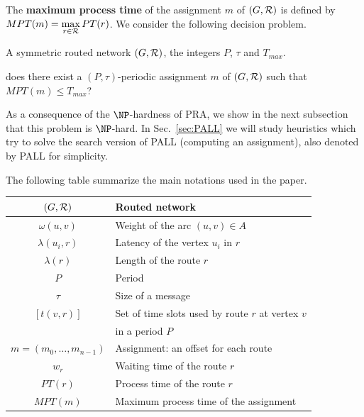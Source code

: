 \documentclass[10pt, conference, letterpaper]{IEEEtran}
\begin{document}
      
    The {\bf maximum process time} of the assignment $m$ of $(G,{\cal R})$ is defined by $MPT(m)=\max\limits_{r \in {\cal R}} PT(r)$. We consider the following decision problem.


        A symmetric routed network $(G,{\cal R})$, the integers $P$, $\tau$ and $T_{max}$.

       does there exist a $(P,\tau)$-periodic assignment $m$ of $(G,{\cal R})$ such that $MPT(m) \leq T_{max}$?

      As a consequence of the $\NP$-hardness of PRA, we show in the next subsection that this problem is $\NP$-hard. 
      In Sec.~\ref{sec:PALL} we will study heuristics which try to solve the search version of PALL (computing an assignment), also denoted by PALL for simplicity.

     
      The following table summarize the main notations used in the paper.
      \begin{center}
   \begin{tabularx}{0.5\textwidth}{|c|X|}
    \hline
     $(G,\cal R)$ & Routed network \\
     \hline
      $\omega(u,v)$ & Weight of the arc $(u,v) \in A$ \\
      \hline
      $\lambda(u_i,r)$ & Latency of the vertex $u_i$ in $r$\\
         \hline
         $\lambda(r)$ & Length of the route $r$\\
         \hline
         $P$ & Period\\
         \hline
         $\tau$ & Size of a message\\
         \hline
         $ [t(v,r)]$& Set of time slots used by route $r$ at vertex $v$ \\
         & in a period $P$\\
         \hline 
         $m=(m_0, \ldots ,m_{n-1})$& Assignment: an offset for each route\\
              \hline 
         $w_r$& Waiting time of the route $r$\\
            \hline 
         $PT(r)$& Process time of the route $r$\\
           \hline 
         $MPT(m)$& Maximum process time of the assignment\\
    \hline

      \end{tabularx}
      \end{center}
\end{document}
